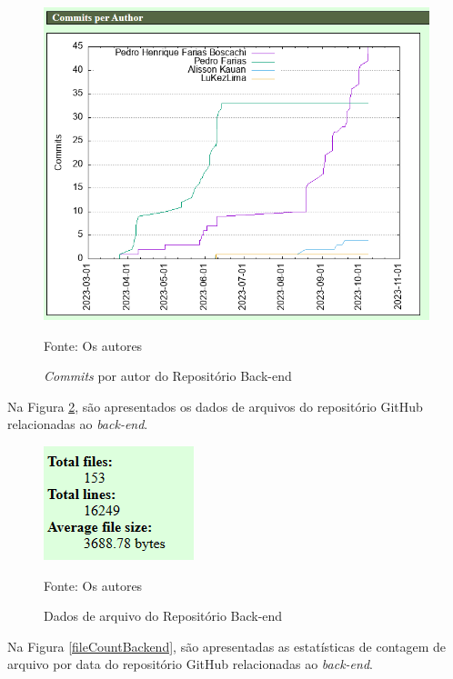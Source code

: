 \begin{apendicesenv}
\begin{figure}[H]
	\centering
	\includegraphics[scale=0.7]{./imagens/metricas/gitStatsBackend/authors/commitsPerAuthors.png}
	\caption{\textit{Commits} por autor do Repositório Back-end}
	Fonte: Os autores
    \label{commitPerAuthorBackend}
\end{figure}

Na Figura \ref{filesBackend}, são apresentados os dados de arquivos do repositório GitHub relacionadas ao \textit{back-end}.

\begin{figure}[H]
	\centering
	\includegraphics[scale=1]{./imagens/metricas/gitStatsBackend/files/files.png}
	\caption{Dados de arquivo do Repositório Back-end}
	Fonte: Os autores
    \label{filesBackend}
\end{figure}
\pagebreak

Na Figura \ref{fileCountBackend}, são apresentadas as estatísticas de contagem de arquivo por data do repositório GitHub relacionadas ao \textit{back-end}.


\end{apendicesenv}

